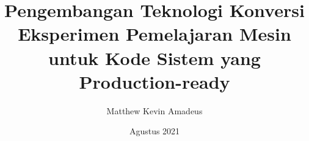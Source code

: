 \title{Pengembangan Teknologi Konversi Eksperimen Pemelajaran Mesin untuk Kode Sistem yang Production-ready}
\date{Agustus 2021}

\newcommand{\nim}{13518035}
\author{Matthew Kevin Amadeus}

\newcommand{\supervisor}{Achmad Imam Kistiantoro, S.T, M.Sc., Ph.D.}
\newcommand{\supervisornip}{19730809 200604 1 001}
\newcommand{\dean}{Dessi Puji Lestari, S.T, M.Eng., Ph.D.}
